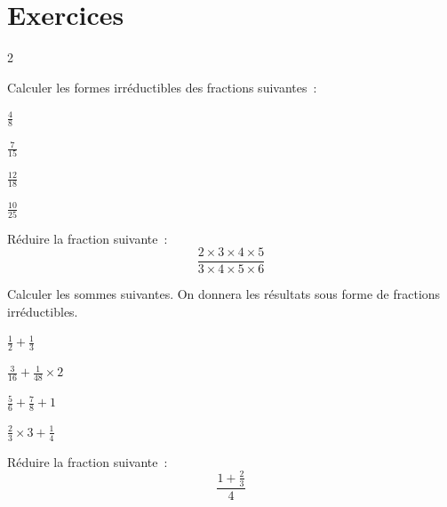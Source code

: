 \documentclass[12pt]{article}
\begin{document}
\section{Exercices}

\begin{multicols}{2}

\begin{exercice}{}{}
    Calculer les formes irréductibles des fractions suivantes~:
    \begin{enumeratebf}
        \item $\frac{4}{8}$
        \item $\frac{7}{15}$
        \item $\frac{12}{18}$
        \item $\frac{10}{25}$
    \end{enumeratebf}
\end{exercice}
\begin{exercice}{}{}
    Réduire la fraction suivante~:
    $$\frac{2 \times 3 \times 4 \times 5}{3 \times 4 \times 5 \times 6}$$
\end{exercice}

\begin{exercice}{}{}
    Calculer les sommes suivantes. On donnera les résultats sous forme de fractions irréductibles.
    \begin{enumeratebf}
        \item $\frac{1}{2} + \frac{1}{3}$
        \item $\frac{3}{16} + \frac{1}{48}\times 2$
        \item $\frac{5}{6} + \frac{7}{8} + 1$
        \item $\frac{2}{3} \times 3 + \frac{1}{4}$
    \end{enumeratebf}
\end{exercice}

\begin{exercice}{}{}
    Réduire la fraction suivante~:
    $$\frac{1 + \frac{2}{3}}{4}$$
\end{exercice}




\end{multicols}
\end{document}
